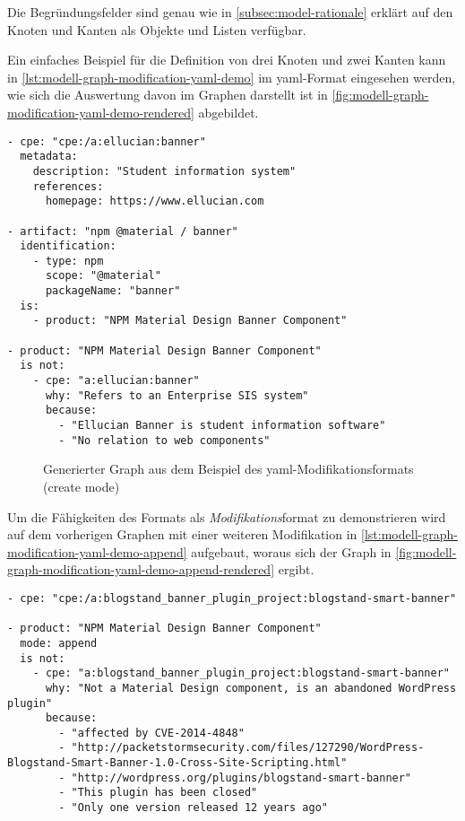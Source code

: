 Die Begründungsfelder sind genau wie in \autoref{subsec:model-rationale} erklärt auf den Knoten und Kanten als Objekte und Listen verfügbar.

Ein einfaches Beispiel für die Definition von drei Knoten und zwei Kanten kann in \autoref{lst:modell-graph-modification-yaml-demo} im \acrshort{yaml}-Format eingesehen werden, wie sich die Auswertung davon im Graphen darstellt ist in \autoref{fig:modell-graph-modification-yaml-demo-rendered} abgebildet.

\begin{lstlisting}[style=yaml,caption={Beispiel des \acrshort{yaml}-Modifikationsformats (create mode)},label={lst:modell-graph-modification-yaml-demo},basicstyle=\ttfamily\scriptsize]
- cpe: "cpe:/a:ellucian:banner"
  metadata:
    description: "Student information system"
    references:
      homepage: https://www.ellucian.com

- artifact: "npm @material / banner"
  identification:
    - type: npm
      scope: "@material"
      packageName: "banner"
  is:
    - product: "NPM Material Design Banner Component"

- product: "NPM Material Design Banner Component"
  is not:
    - cpe: "a:ellucian:banner"
      why: "Refers to an Enterprise SIS system"
      because:
        - "Ellucian Banner is student information software"
        - "No relation to web components"
\end{lstlisting}

\begin{figure}[htbp]
    \centering
    \makebox[\textwidth]{}
    \caption{Generierter Graph aus dem Beispiel des \acrshort{yaml}-Modifikationsformats (create mode)}
    \label{fig:modell-graph-modification-yaml-demo-rendered}
\end{figure}

Um die Fähigkeiten des Formats als \textit{Modifikations}format zu demonstrieren wird auf dem vorherigen Graphen mit einer weiteren Modifikation in \autoref{lst:modell-graph-modification-yaml-demo-append} aufgebaut, woraus sich der Graph in \autoref{fig:modell-graph-modification-yaml-demo-append-rendered} ergibt.

\begin{lstlisting}[style=yaml,caption={Beispiel des \acrshort{yaml}-Modifikationsformats (append mode)},label={lst:modell-graph-modification-yaml-demo-append},basicstyle=\ttfamily\scriptsize]
- cpe: "cpe:/a:blogstand_banner_plugin_project:blogstand-smart-banner"

- product: "NPM Material Design Banner Component"
  mode: append
  is not:
    - cpe: "a:blogstand_banner_plugin_project:blogstand-smart-banner"
      why: "Not a Material Design component, is an abandoned WordPress plugin"
      because:
        - "affected by CVE-2014-4848"
        - "http://packetstormsecurity.com/files/127290/WordPress-Blogstand-Smart-Banner-1.0-Cross-Site-Scripting.html"
        - "http://wordpress.org/plugins/blogstand-smart-banner"
        - "This plugin has been closed"
        - "Only one version released 12 years ago"
\end{lstlisting}

